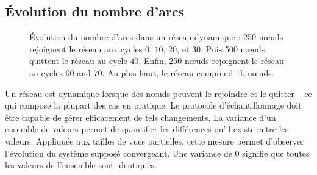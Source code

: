 \subsection{Évolution du nombre d'arcs}
\label{net:subsec:churn}

\begin{figure}
  \centering 
  \hspace{10pt}
  \caption[Évolution du nombre d'arcs dans un réseau dynamique]
  {\label{net:fig:churn} Évolution du nombre d'arcs dans un réseau dynamique :
    250 nœuds rejoignent le réseau aux cycles $0$, $10$, $20$, et $30$. Puis 500
    nœuds quittent le réseau au cycle $40$. Enfin, 250 nœuds rejoignent le
    réseau au cycles $60$ and $70$. Au plus haut, le réseau comprend 1k nœuds.}
\end{figure}

Un réseau est dynamique lorsque des nœuds peuvent le rejoindre et le quitter --
ce qui compose la plupart des cas en pratique. Le protocole d'échantillonnage
doit être capable de gérer efficacement de tels changements. La variance d'un
ensemble de valeurs permet de quantifier les différences qu'il existe entre les
valeurs. Appliquée aux tailles de vues partielles, cette mesure permet
d'observer l'évolution du système supposé convergeant. Une variance de 0
signifie que toutes les valeurs de l'ensemble sont identiques.

